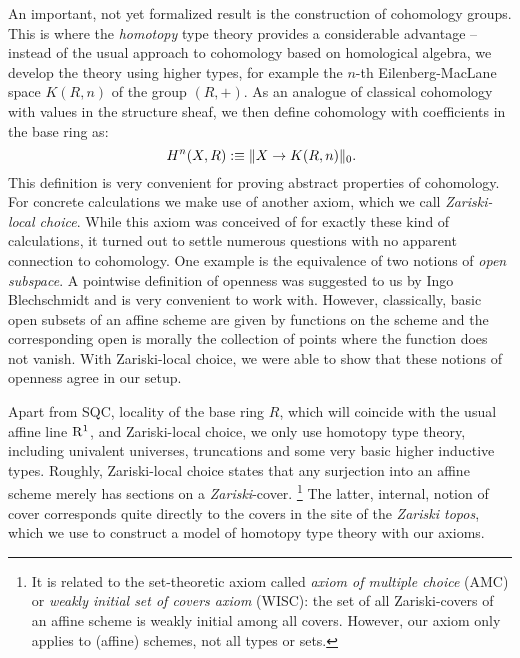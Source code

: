 An important, not yet formalized result
is the construction of cohomology groups.
This is where the \emph{homotopy} type theory provides a considerable advantage --
instead of the usual approach to cohomology based on homological algebra,
we develop the theory using higher types,
for example the $n$-th Eilenberg-MacLane space $K(R,n)$ of the group $(R,+)$.
As an analogue of classical cohomology with values in the structure sheaf,
we then define cohomology with coefficients in the base ring as:
\[
  H^n(X,R):\equiv \propTrunc{X\to K(R,n)}_0
  \rlap{.}
\]
This definition is very convenient for proving abstract properties of cohomology.
For concrete calculations we make use of another axiom,
which we call \emph{Zariski-local choice}.
While this axiom was conceived of for exactly these kind of calculations,
it turned out to settle numerous questions with no apparent connection to cohomology.
One example is the equivalence of two notions of \emph{open subspace}.
A pointwise definition of openness was suggested to us by Ingo Blechschmidt and
is very convenient to work with.
However, classically, basic open subsets of an affine scheme are given
by functions on the scheme and the corresponding open is morally the collection of points where the function does not vanish.
With Zariski-local choice, we were able to show that these notions of openness agree in our setup.

Apart from SQC, locality of the base ring $R$, which will coincide with the usual affine line $\mathrm{R}^1$, and Zariski-local choice,
we only use homotopy type theory, including univalent universes, truncations and some very basic higher inductive types.
Roughly, Zariski-local choice states that any surjection into an affine scheme merely has sections on a \emph{Zariski}-cover.%
\footnote{It is related to the set-theoretic axiom called
\emph{axiom of multiple choice} (AMC) \cite{vandenberg-moerdijk-amc} or \emph{weakly initial set of covers axiom} (WISC):
the set of all Zariski-covers of an affine scheme is weakly initial among all covers.
However, our axiom only applies to (affine) schemes, not all types or sets.}
The latter, internal, notion of cover corresponds quite directly to the covers in the site of the \emph{Zariski topos},
which we use to construct a model of homotopy type theory with our axioms.

